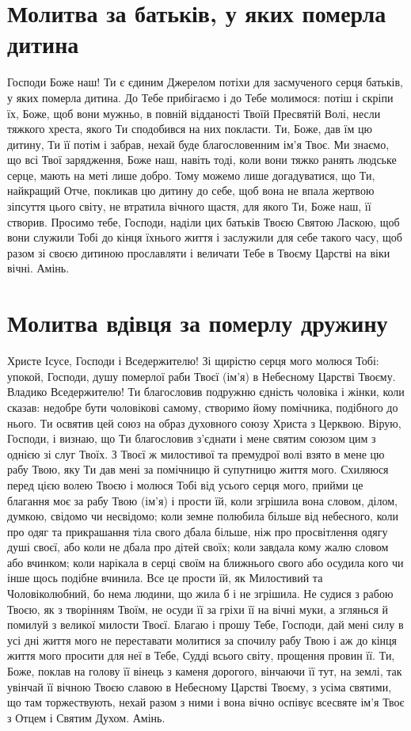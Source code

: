 \documentclass[chapters.tex]{subfiles}
\begin{document}
\section{Молитва за батьків, у яких померла дитина}
Господи Боже наш! Ти є єдиним Джерелом потіхи для засмученого серця батьків, у яких померла дитина. До Тебе прибігаємо і до Тебе молимося: потіш і скріпи їх, Боже, щоб вони мужньо, в повній відданості Твоїй Пресвятій Волі, несли тяжкого хреста, якого Ти сподобився на них покласти. Ти, Боже, дав їм цю дитину, Ти її потім і забрав, нехай буде благословенним ім’я Твоє. Ми знаємо, що всі Твої зарядження, Боже наш, навіть тоді, коли вони тяжко ранять людське серце, мають на меті лише добро. Тому можемо лише догадуватися, що Ти, найкращий Отче, покликав цю дитину до себе, щоб вона не впала жертвою зіпсуття цього світу, не втратила вічного щастя, для якого Ти, Боже наш, її створив. Просимо тебе, Господи, наділи цих батьків Твоєю Святою Ласкою, щоб вони служили Тобі до кінця їхнього життя і заслужили для себе такого часу, щоб разом зі своєю дитиною прославляти і величати Тебе в Твоєму Царстві на віки вічні. Амінь.

\section{Молитва вдівця за померлу дружину}
Христе Ісусе, Господи і Вседержителю! Зі щирістю серця мого молюся Тобі: упокой, Господи, душу померлої раби Твоєї (ім’я) в Небесному Царстві Твоєму. Владико Вседержителю! Ти благословив подружню єдність чоловіка і жінки, коли сказав: недобре бути чоловікові самому, створимо йому помічника, подібного до нього. Ти освятив цей союз на образ духовного союзу Христа з Церквою. Вірую, Господи, і визнаю, що Ти благословив з’єднати і мене святим союзом цим з однією зі слуг Твоїх. З Твоєї ж милостивої та премудрої волі взято в мене цю рабу Твою, яку Ти дав мені за помічницю й супутницю життя мого. Схиляюся перед цією волею Твоєю і молюся Тобі від усього серця мого, прийми це благання моє за рабу Твою (ім’я) і прости їй, коли згрішила вона словом, ділом, думкою, свідомо чи несвідомо; коли земне полюбила більше від небесного, коли про одяг та прикрашання тіла свого дбала більше, ніж про просвітлення одягу душі своєї, або коли не дбала про дітей своїх; коли завдала кому жалю словом або вчинком; коли нарікала в серці своїм на ближнього свого або осудила кого чи інше щось подібне вчинила. Все це прости їй, як Милостивий та Чоловіколюбний, бо нема людини, що жила б і не згрішила. Не судися з рабою Твоєю, як з творінням Твоїм, не осуди її за гріхи її на вічні муки, а зглянься й помилуй з великої милости Твоєї. Благаю і прошу Тебе, Господи, дай мені силу в усі дні життя мого не переставати молитися за спочилу рабу Твою і аж до кінця життя мого просити для неї в Тебе, Судді всього світу, прощення провин її. Ти, Боже, поклав на голову її вінець з каменя дорогого, вінчаючи її тут, на землі, так увінчай її вічною Твоєю славою в Небесному Царстві Твоєму, з усіма святими, що там торжествують, нехай разом з ними і вона вічно оспівує всесвяте ім’я Твоє з Отцем і Святим Духом. Амінь.
\end{document}
